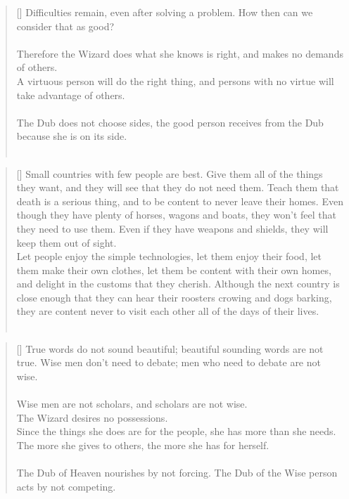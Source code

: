 \documentclass{article}
\begin{document}
\settowidth{\versewidth}{The Wizard leads byemptying people’s minds, filling their bellies, weakening their am- bitions, and making them become strong}
\begin{verse}[\versewidth]
Difficulties remain, even after solving a problem. 
How then can we consider that as good?\\
\hfill\\
Therefore the Wizard does what she knows is right, and makes no demands of others.\\
A virtuous person will do the right thing, and persons with no virtue will take advantage of others.\\
\hfill\\
The Dub does not choose sides, the good person receives from the Dub because she is on its side.\\
\hfill\\
\end{verse}

\settowidth{\versewidth}{The Wizard leads byemptying people’s minds, filling their bellies, weakening their am- bitions, and making them become strong}
\begin{verse}[\versewidth]
Small countries with few people are best. 
Give them all of the things they want, and they will see that they do not need them. 
Teach them that death is a serious thing, and to be content to never leave their homes. 
Even though they have plenty of horses, wagons and boats, they won't feel that they need to use them. 
Even if they have weapons and shields, they will keep them out of sight.\\
Let people enjoy the simple technologies, let them enjoy their food, let them make their own clothes, let them be content with their own homes, and delight in the customs that they cherish. 
Although the next country is close enough that they can hear their roosters crowing and dogs barking, they are content never to visit each other all of the days of their lives.\\
\hfill\\
\end{verse}

\settowidth{\versewidth}{The Wizard leads byemptying people’s minds, filling their bellies, weakening their am- bitions, and making them become strong}
\begin{verse}[\versewidth]
True words do not sound beautiful; beautiful sounding words are not true. 
Wise men don't need to debate; men who need to debate are not wise.\\
\hfill\\
Wise men are not scholars, and scholars are not wise.\\
The Wizard desires no possessions.\\
Since the things she does are for the people, she has more than she needs.\\
The more she gives to others, the more she has for herself.\\
\hfill\\
The Dub of Heaven nourishes by not forcing. 
The Dub of the Wise person acts by not competing.\\
\end{verse}
\end{document}
